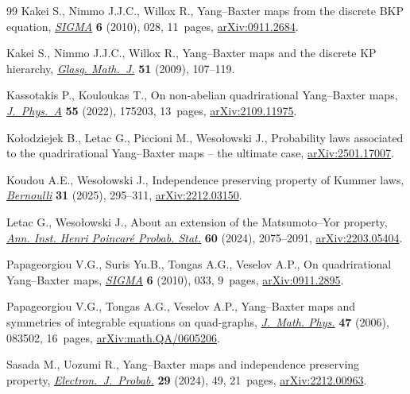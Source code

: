 \documentclass[pdftex]{sigma}
\numberwithin{equation}{section}
\begin{document}
\begin{thebibliography}{99}
Kakei S., Nimmo J.J.C., Willox R., Yang--{B}axter maps from the discrete {BKP}
 equation, \href{https://doi.org/10.3842/SIGMA.2010.028}{\textit{SIGMA}}
 \textbf{6} (2010), 028, 11~pages,
 \href{http://arxiv.org/abs/0911.2684}{arXiv:0911.2684}.

Kakei S., Nimmo J.J.C., Willox R., Yang--{B}axter maps and the discrete {KP}
 hierarchy, \href{https://doi.org/10.1017/S0017089508004825}{\textit{Glasg.
 Math.~J.}} \textbf{51} (2009), 107--119.

Kassotakis P., Kouloukas T., On non-abelian quadrirational {Y}ang--{B}axter
 maps, \href{https://doi.org/10.1088/1751-8121/ac5afd}{\textit{J.~Phys.~A}}
 \textbf{55} (2022), 175203, 13~pages,
 \href{http://arxiv.org/abs/2109.11975}{arXiv:2109.11975}.

Ko{\l}odziejek B., Letac G., Piccioni M., Weso{\l}owski J., Probability laws
 associated to the quadrirational {Y}ang--{B}axter maps -- the ultimate case,
 \href{http://arxiv.org/abs/2501.17007}{arXiv:2501.17007}.

Koudou A.E., Weso{\l}owski J., Independence preserving property of {K}ummer
 laws, \href{https://doi.org/10.3150/24-bej1728}{\textit{Bernoulli}}
 \textbf{31} (2025), 295--311,
 \href{http://arxiv.org/abs/2212.03150}{arXiv:2212.03150}.

Letac G., Weso{\l}owski J., About an extension of the {M}atsumoto--{Y}or
 property, \href{https://doi.org/10.1214/23-aihp1373}{\textit{Ann. Inst. Henri
 Poincar\'e Probab. Stat.}} \textbf{60} (2024), 2075--2091,
 \href{http://arxiv.org/abs/2203.05404}{arXiv:2203.05404}.

Papageorgiou V.G., Suris Yu.B., Tongas A.G., Veselov A.P., On quadrirational
 {Y}ang--{B}axter maps,
 \href{https://doi.org/10.3842/SIGMA.2010.033}{\textit{SIGMA}} \textbf{6}
 (2010), 033, 9~pages, \href{http://arxiv.org/abs/0911.2895}{arXiv:0911.2895}.

Papageorgiou V.G., Tongas A.G., Veselov A.P., Yang--{B}axter maps and
 symmetries of integrable equations on quad-graphs,
 \href{https://doi.org/10.1063/1.2227641}{\textit{J.~Math. Phys.}} \textbf{47}
 (2006), 083502, 16~pages,
 \href{http://arxiv.org/abs/math.QA/0605206}{arXiv:math.QA/0605206}.

Sasada M., Uozumi R., Yang--{B}axter maps and independence preserving property,
 \href{https://doi.org/10.1214/24-ejp1107}{\textit{Electron.~J.~Probab.}}
 \textbf{29} (2024), 49, 21~pages,
 \href{http://arxiv.org/abs/2212.00963}{arXiv:2212.00963}.


\end{thebibliography}
\end{document}
